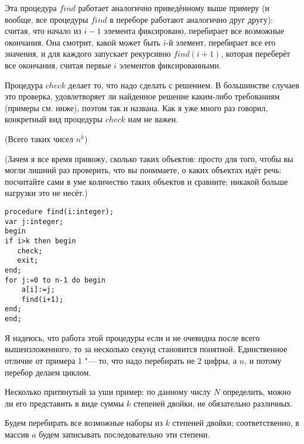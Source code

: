 Эта процедура $find$ работает аналогично приведённому выше примеру (и вообще, все 
процедуры $find$ в переборе работают аналогично друг другу): считая, что начало 
из $i-1$ элемента фиксировано, перебирает все возможные окончания. Она смотрит, 
какой может быть $i$-й элемент, перебирает все его значения, и для каждого 
запускает рекурсивно $find(i+1)$, которая переберёт все окончания, считая первые 
$i$ элементов фиксированными.

Процедура $check$ делает то, что надо сделать с решением. В большинстве случаев 
это проверка, удовлетворяет ли найденное решение каким-либо требованиям 
(примеры см. ниже), поэтом так и названа. Как я уже много раз говорил, 
конкретный вид процедуры $check$ нам не важен.

(Всего таких чисел $n^k$)\nopagebreak

(Зачем я все время привожу, сколько таких объектов: просто для того, чтобы вы 
могли лишний раз проверить, что вы понимаете, о каких объектах идёт речь: посчитайте сами в уме количество таких объектов и сравните; никакой больше нагрузки это не несёт.)

\begin{codesampleo}\begin{verbatim}
procedure find(i:integer);
var j:integer;
begin
if i>k then begin
   check;
   exit;
end;
for j:=0 to n-1 do begin
    a[i]:=j;
    find(i+1);
end;
end;
\end{verbatim}
\end{codesampleo}

Я надеюсь, что работа этой процедуры если и не очевидна после всего 
вышеизложенного, то за несколько секунд становится понятной. Единственное 
отличие от примера 1 "--- то, что надо перебирать не $2$ цифры, а $n$, и потому 
перебор делаем циклом.

Несколько притянутый за уши пример: по данному числу $N$ определить, можно ли его 
представить в виде суммы $k$ степеней двойки, не обязательно различных.


Будем перебирать все возможные наборы из $k$ степеней двойки; соответственно, в 
массив $a$ будем записывать последовательно эти степени.

